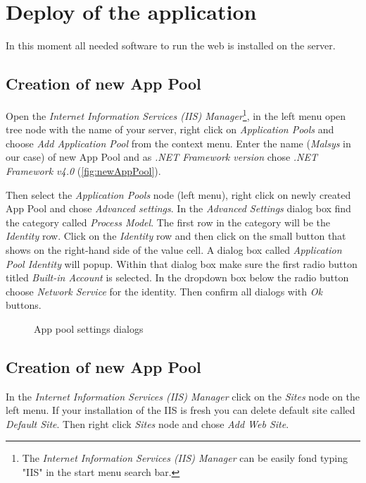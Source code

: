 \section{Deploy of the application}

In this moment all needed software to run the web is installed on the server.


\subsection{Creation of new App Pool}

Open the \emph{Internet Information Services (IIS) Manager}\footnote{The \emph{Internet Information Services (IIS) Manager} can be easily fond typing "IIS" in the start menu search bar.}, in the left menu open tree node with the name of your server, right click on \emph{Application Pools} and choose \emph{Add Application Pool} from the context menu.
Enter the name (\emph{Malsys} in our case) of new App Pool and as \emph{.NET Framework version} chose \emph{.NET Framework v4.0} (\autoref{fig:newAppPool}).

Then select the \emph{Application Pools} node (left menu), right click on newly created App Pool and chose \emph{Advanced settings}.
In the \emph{Advanced Settings} dialog box find the category called \emph{Process Model}.
The first row in the category will be the \emph{Identity} row.
Click on the \emph{Identity} row and then click on the small button that shows on the right-hand side of the value cell.
A dialog box called \emph{Application Pool Identity} will popup.
Within that dialog box make sure the first radio button titled \emph{Built-in Account} is selected.
In the dropdown box below the radio button choose \emph{Network Service} for the identity.
Then confirm all dialogs with \emph{Ok} buttons.

\begin{figure}[h!]
	 \hfill
	\caption{App pool settings dialogs}
\end{figure}


\subsection{Creation of new App Pool}

In the \emph{Internet Information Services (IIS) Manager} click on the \emph{Sites} node on the left menu.
If your installation of the IIS is fresh you can delete default site called \emph{Default Site}.
Then right click \emph{Sites} node and chose \emph{Add Web Site}.


